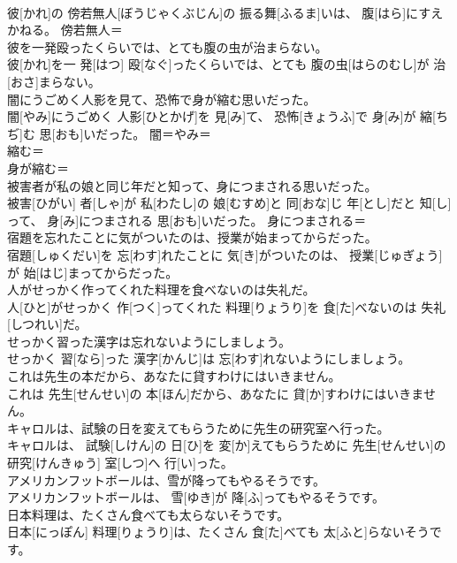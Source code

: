 \documentclass[8pt]{extreport}
\begin{document}
\begin{CJK}{UTF8}{min}
\\	彼[かれ]の 傍若無人[ぼうじゃくぶじん]の 振る舞[ふるま]いは、 腹[はら]にすえかねる。	傍若無人＝ 
\\	彼を一発殴ったくらいでは、とても腹の虫が治まらない。	
\\	彼[かれ]を一 発[はつ] 殴[なぐ]ったくらいでは、とても 腹の虫[はらのむし]が 治[おさ]まらない。	
\\	闇にうごめく人影を見て、恐怖で身が縮む思いだった。	
\\	闇[やみ]にうごめく 人影[ひとかげ]を 見[み]て、 恐怖[きょうふ]で 身[み]が 縮[ちぢ]む 思[おも]いだった。	闇＝やみ＝ 
\\	縮む＝ 
\\	身が縮む＝ 
\\	被害者が私の娘と同じ年だと知って、身につまされる思いだった。	
\\	被害[ひがい] 者[しゃ]が 私[わたし]の 娘[むすめ]と 同[おな]じ 年[とし]だと 知[し]って、 身[み]につまされる 思[おも]いだった。	身につまされる＝ 
\\	宿題を忘れたことに気がついたのは、授業が始まってからだった。	
\\	宿題[しゅくだい]を 忘[わす]れたことに 気[き]がついたのは、 授業[じゅぎょう]が 始[はじ]まってからだった。	
\\	人がせっかく作ってくれた料理を食べないのは失礼だ。	
\\	人[ひと]がせっかく 作[つく]ってくれた 料理[りょうり]を 食[た]べないのは 失礼[しつれい]だ。	
\\	せっかく習った漢字は忘れないようにしましょう。	
\\	せっかく 習[なら]った 漢字[かんじ]は 忘[わす]れないようにしましょう。	
\\	これは先生の本だから、あなたに貸すわけにはいきません。	
\\	これは 先生[せんせい]の 本[ほん]だから、あなたに 貸[か]すわけにはいきません。	
\\	キャロルは、試験の日を変えてもらうために先生の研究室へ行った。	
\\	キャロルは、 試験[しけん]の 日[ひ]を 変[か]えてもらうために 先生[せんせい]の 研究[けんきゅう] 室[しつ]へ 行[い]った。	
\\	アメリカンフットボールは、雪が降ってもやるそうです。	
\\	アメリカンフットボールは、 雪[ゆき]が 降[ふ]ってもやるそうです。	
\\	日本料理は、たくさん食べても太らないそうです。	
\\	日本[にっぽん] 料理[りょうり]は、たくさん 食[た]べても 太[ふと]らないそうです。	

\end{CJK}
\end{document}
